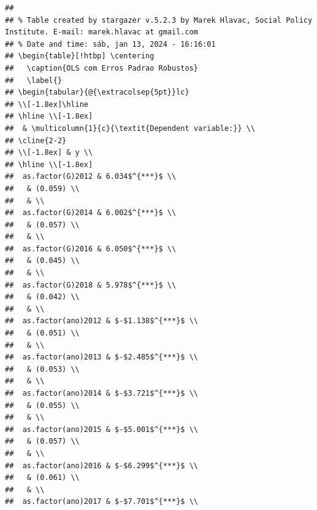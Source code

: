 \documentclass[
]{article}
\begin{document}
\begin{verbatim}
## 
## % Table created by stargazer v.5.2.3 by Marek Hlavac, Social Policy Institute. E-mail: marek.hlavac at gmail.com
## % Date and time: sáb, jan 13, 2024 - 16:16:01
## \begin{table}[!htbp] \centering 
##   \caption{OLS com Erros Padrao Robustos} 
##   \label{} 
## \begin{tabular}{@{\extracolsep{5pt}}lc} 
## \\[-1.8ex]\hline 
## \hline \\[-1.8ex] 
##  & \multicolumn{1}{c}{\textit{Dependent variable:}} \\ 
## \cline{2-2} 
## \\[-1.8ex] & y \\ 
## \hline \\[-1.8ex] 
##  as.factor(G)2012 & 6.034$^{***}$ \\ 
##   & (0.059) \\ 
##   & \\ 
##  as.factor(G)2014 & 6.002$^{***}$ \\ 
##   & (0.057) \\ 
##   & \\ 
##  as.factor(G)2016 & 6.050$^{***}$ \\ 
##   & (0.045) \\ 
##   & \\ 
##  as.factor(G)2018 & 5.978$^{***}$ \\ 
##   & (0.042) \\ 
##   & \\ 
##  as.factor(ano)2012 & $-$1.138$^{***}$ \\ 
##   & (0.051) \\ 
##   & \\ 
##  as.factor(ano)2013 & $-$2.485$^{***}$ \\ 
##   & (0.053) \\ 
##   & \\ 
##  as.factor(ano)2014 & $-$3.721$^{***}$ \\ 
##   & (0.055) \\ 
##   & \\ 
##  as.factor(ano)2015 & $-$5.001$^{***}$ \\ 
##   & (0.057) \\ 
##   & \\ 
##  as.factor(ano)2016 & $-$6.299$^{***}$ \\ 
##   & (0.061) \\ 
##   & \\ 
##  as.factor(ano)2017 & $-$7.701$^{***}$ \\ 

\end{verbatim}
\end{document}
